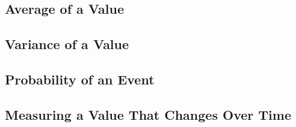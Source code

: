 
\subsection{Average of a Value}

\subsection{Variance of a Value}

\subsection{Probability of an Event}


\subsection{Measuring a Value That Changes Over Time}




